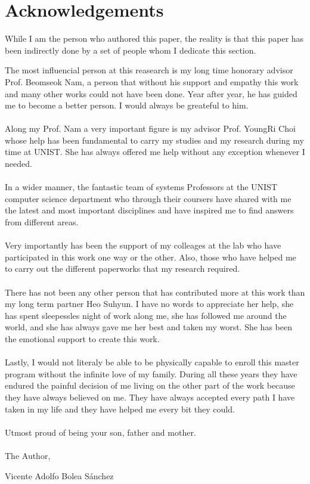 \section*{\hfill \Large Acknowledgements \hfill} 

While I am the person who authored this paper, the reality is that this paper
has been indirectly done by a set of people whom I dedicate this section.

The most influencial person at this reasearch is my long time honorary advisor
Prof. Beomseok Nam, a person that without his support and empathy this work and
many other works could not have been done. Year after year, he has guided me to
become a better person.  I would always be greateful to him.\\ \\

Along my Prof. Nam a very important figure is my advisor Prof. YoungRi Choi
whose help has been fundamental to carry my studies and my research during my
time at UNIST.  She has always offered me help without any exception whenever I
needed.  \\ \\

In a wider manner, the fantastic team of systems Professors at the UNIST
computer science department who through their coursers have shared with me the
latest and most important disciplines and have inspired me to find answers from
different areas. \\ \\ 

Very importantly has been the support of my colleages at the lab who have
participated in this work one way or the other. Also, those who have helped me
to carry out the different paperworks that my research required. \\ \\ 

There has not been any other person that has contributed more at this work than
my long term partner Heo Suhyun. I have no words to appreciate her help, she
has spent sleepessles night of work along me, she has followed me around the
world, and she has always gave me her best and taken my worst. 
She has been the emotional support to create this work. \\ \\ 

Lastly, I would not literaly be able to be physically capable to enroll
this master program without the infinite love of my family. During all these
years they have endured the painful decision of me living on the other part of
the work because they have always believed on me. They have always accepted every
path I have taken in my life and they have helped me every bit they could.  \\ \\ 


Utmost proud of being your son, father and mother.  \\ \\


The Author,

Vicente Adolfo Bolea S\'anchez

